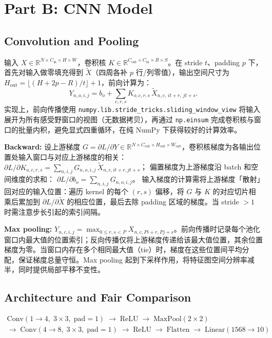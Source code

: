 \documentclass[11pt,fontset=fandol]{ctexart}
\begin{document}
\section{Part B: CNN Model}

\subsection{Convolution and Pooling}

输入 $X \in \mathbb{R}^{N \times C_\text{in} \times H \times W}$，卷积核 $K \in \mathbb{R}^{C_\text{out} \times C_\text{in} \times R \times S}$。在 stride $t$、padding $p$ 下，首先对输入做零填充得到 $\tilde{X}$（四周各补 $p$ 行/列零值），输出空间尺寸为 $H_\text{out} = \lfloor(H + 2p - R)/t\rfloor + 1$，前向计算为：
\[
    Y_{n,o,i,j}
    = b_o + \textstyle\sum_{c,r,s} K_{o,c,r,s}\, \tilde{X}_{n,c,\,it+r,\,jt+s}.
\]
实现上，前向传播使用 \texttt{numpy.lib.stride\_tricks.sliding\_window\_view} 将输入展开为所有感受野窗口的视图（无数据拷贝），再通过 \texttt{np.einsum} 完成卷积核与窗口的批量内积，避免显式四重循环，在纯 NumPy 下获得较好的计算效率。

\smallskip\noindent
\textbf{Backward:}\;
设上游梯度 $G = \partial L / \partial Y \in \mathbb{R}^{N \times C_\text{out} \times H_\text{out} \times W_\text{out}}$，卷积核梯度为各输出位置处输入窗口与对应上游梯度的相关：
$\partial L/\partial K_{o,c,r,s} = \sum_{n,i,j} G_{n,o,i,j}\, \tilde{X}_{n,c,it+r,jt+s}$；
偏置梯度为上游梯度沿 batch 和空间维度的求和：
$\partial L/\partial b_o = \sum_{n,i,j} G_{n,o,i,j}$。
输入梯度的计算需将上游梯度「散射」回对应的输入位置：遍历 kernel 的每个 $(r,s)$ 偏移，将 $G$ 与 $K$ 的对应切片相乘后累加到 $\partial L / \partial \tilde{X}$ 的相应位置，最后去除 padding 区域的梯度。当 stride $> 1$ 时需注意步长引起的索引间隔。

\smallskip\noindent
\textbf{Max pooling:}\;
$Y_{n,c,i,j} = \max_{0 \le r,s < P} X_{n,c,Pi+r,Pj+s}$。前向传播时记录每个池化窗口内最大值的位置索引；反向传播仅将上游梯度传递给该最大值位置，其余位置梯度为零。当窗口内存在多个相同最大值（tie）时，梯度在这些位置间平均分配，保证梯度总量守恒。Max pooling 起到下采样作用，将特征图空间分辨率减半，同时提供局部平移不变性。

\subsection{Architecture and Fair Comparison}

\begin{gather*}
\text{Conv}(1{\to}4,\;3{\times}3,\;\text{pad}{=}1)
\;\to\; \text{ReLU}
\;\to\; \text{MaxPool}(2{\times}2) \\
\to\; \text{Conv}(4{\to}8,\;3{\times}3,\;\text{pad}{=}1)
\;\to\; \text{ReLU}
\;\to\; \text{Flatten}
\;\to\; \text{Linear}(1568 \to 10)
\end{gather*}
\end{document}
